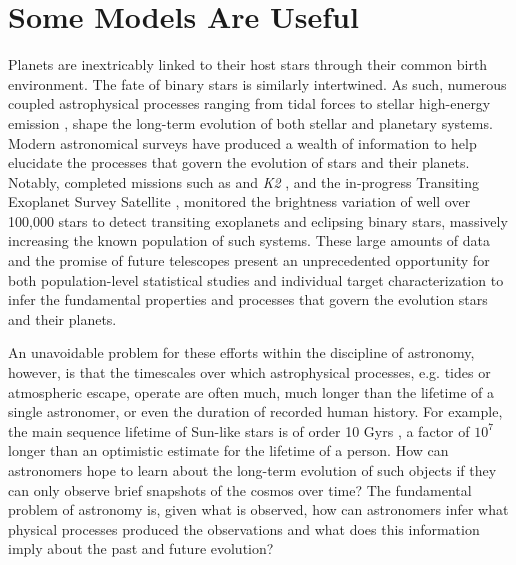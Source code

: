 
\section{Some Models Are Useful}

Planets are inextricably linked to their host stars through their common birth environment. The fate of binary stars is similarly intertwined.  As such, numerous coupled astrophysical processes ranging from tidal forces \citep{Zahn1989,Barnes2017} to stellar high-energy emission \citep{Airapetian2019}, shape the long-term evolution of both stellar and planetary systems. Modern astronomical surveys have produced a wealth of information to help elucidate the processes that govern the evolution of stars and their planets. Notably, completed missions such as \kepler \citep{Borucki2003,Borucki2010} and \textit{K2} \citep{Howell2014}, and the in-progress Transiting Exoplanet Survey Satellite \citep[TESS, ][]{Ricker2014}, monitored the brightness variation of well over 100,000 stars to detect transiting exoplanets and eclipsing binary stars, massively increasing the known population of such systems.  These large amounts of data and the promise of future telescopes present an unprecedented opportunity for both population-level statistical studies and individual target characterization to infer the fundamental properties and processes that govern the evolution stars and their planets.

An unavoidable problem for these efforts within the discipline of astronomy, however, is that the timescales over which astrophysical processes, e.g. tides or atmospheric escape, operate are often much, much longer than the lifetime of a single astronomer, or even the duration of recorded human history. For example, the main sequence lifetime of Sun-like stars is of order 10 Gyrs \citep{Baraffe2015}, a factor of $10^7$ longer than an optimistic estimate for the lifetime of a person. How can astronomers hope to learn about the long-term evolution of such objects if they can only observe brief snapshots of the cosmos over time? The fundamental problem of astronomy is, given what is observed, how can astronomers infer what physical processes produced the observations and what does this information imply about the past and future evolution? 


